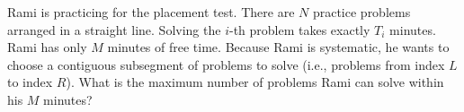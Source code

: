 Rami is practicing for the placement test. There are $N$ practice problems arranged in a straight line. Solving the $i$-th problem takes exactly $T_i$ minutes. Rami has only $M$ minutes of free time.
Because Rami is systematic, he wants to choose a contiguous subsegment of problems to solve (i.e., problems from index $L$ to index $R$). What is the maximum number of problems Rami can solve within his $M$ minutes?